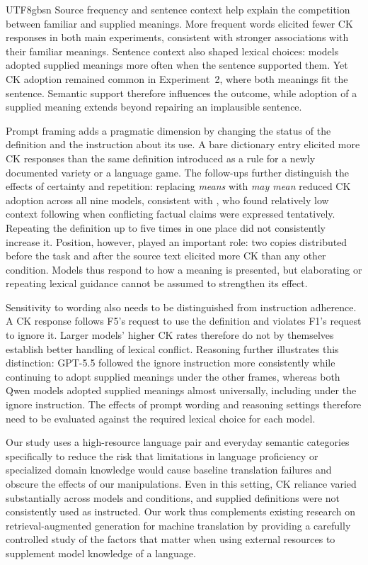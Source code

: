 \documentclass[11pt]{article}
\begin{document}
\begin{CJK*}{UTF8}{gbsn}
Source frequency and sentence context help explain the competition between familiar and supplied meanings. More frequent words elicited fewer CK responses in both main experiments, consistent with stronger associations with their familiar meanings. Sentence context also shaped lexical choices: models adopted supplied meanings more often when the sentence supported them. Yet CK adoption remained common in Experiment~2, where both meanings fit the sentence. Semantic support therefore influences the outcome, while adoption of a supplied meaning extends beyond repairing an implausible sentence.

Prompt framing adds a pragmatic dimension by changing the status of the definition and the instruction about its use. A bare dictionary entry elicited more CK responses than the same definition introduced as a rule for a newly documented variety or a language game. The follow-ups further distinguish the effects of certainty and repetition: replacing \emph{means} with \emph{may mean} reduced CK adoption across all nine models, consistent with \citet{du2026belief}, who found relatively low context following when conflicting factual claims were expressed tentatively. Repeating the definition up to five times in one place did not consistently increase it. Position, however, played an important role: two copies distributed before the task and after the source text elicited more CK than any other condition. Models thus respond to how a meaning is presented, but elaborating or repeating lexical guidance cannot be assumed to strengthen its effect.

Sensitivity to wording also needs to be distinguished from instruction adherence. A CK response follows F5's request to use the definition and violates F1's request to ignore it. Larger models' higher CK rates therefore do not by themselves establish better handling of lexical conflict. Reasoning further illustrates this distinction: GPT-5.5 followed the ignore instruction more consistently while continuing to adopt supplied meanings under the other frames, whereas both Qwen models adopted supplied meanings almost universally, including under the ignore instruction. The effects of prompt wording and reasoning settings therefore need to be evaluated against the required lexical choice for each model.

Our study uses a high-resource language pair and everyday semantic categories specifically to reduce the risk that limitations in language proficiency or specialized domain knowledge would cause baseline translation failures and obscure the effects of our manipulations. Even in this setting, CK reliance varied substantially across models and conditions, and supplied definitions were not consistently used as instructed. Our work thus complements existing research on retrieval-augmented generation for machine translation by providing a carefully controlled study of the factors that matter when using external resources to supplement model knowledge of a language. 


\end{CJK*}
\end{document}
